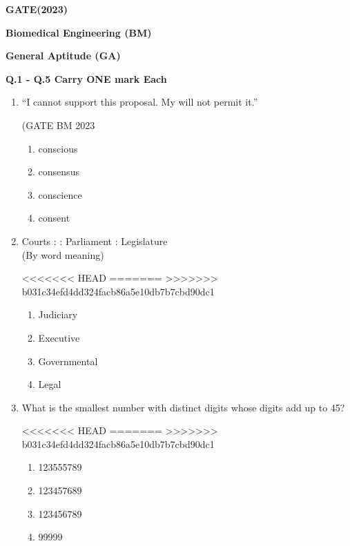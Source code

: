 \documentclass[journal]{IEEEtran}
\begin{document}

\begin{center}
    \textbf{\Large GATE(2023)}
    
    \textbf{Biomedical Engineering (BM)}
    
    \vspace{0.5cm}
    \textbf{General Aptitude (GA)}
    \end{center}

    \textbf{Q.1 - Q.5 Carry ONE mark Each}

\begin{enumerate}
   
 \item \quad ``I cannot support this proposal. My \underline{\hspace{3cm}} will not permit it.''
 
\hfill (GATE BM 2023

\begin{enumerate}
    \item conscious
    \item consensus
    \item conscience
    \item consent
    
\end{enumerate}


\item  \quad Courts : \underline{\hspace{2cm}} : Parliament : Legislature\\
(By word meaning)

<<<<<<< HEAD
\hfill{}
=======
\hfill{}
>>>>>>> b031c34efd4dd324facb86a5e10db7b7cbd90dc1

\begin{enumerate}
    \item Judiciary
    \item Executive
    \item Governmental
    \item Legal
\end{enumerate}


 \item What is the smallest number with distinct digits whose digits add up to 45?

<<<<<<< HEAD
\hfill{}
=======
\hfill{}
>>>>>>> b031c34efd4dd324facb86a5e10db7b7cbd90dc1

\begin{enumerate}
    \item 123555789
    \item 123457689
    \item 123456789
    \item 99999
\end{enumerate}



\end{enumerate}
\end{document}
